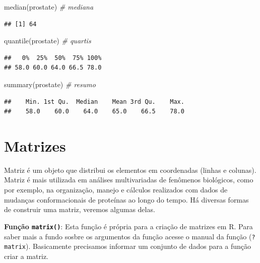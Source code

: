 \documentclass[
]{book}
\newenvironment{Shaded}{\begin{snugshade}}{\end{snugshade}}
\newcommand{\CommentTok}[1]{\textcolor[rgb]{0.56,0.35,0.01}{\textit{#1}}}
\newcommand{\FunctionTok}[1]{\textcolor[rgb]{0.00,0.00,0.00}{#1}}
\newcommand{\NormalTok}[1]{#1}
\begin{document}
\begin{Shaded}
\begin{Highlighting}[]
\FunctionTok{median}\NormalTok{(prostate)   }\CommentTok{\# mediana}
\end{Highlighting}
\end{Shaded}

\begin{verbatim}
## [1] 64
\end{verbatim}

\begin{Shaded}
\begin{Highlighting}[]
\FunctionTok{quantile}\NormalTok{(prostate) }\CommentTok{\# quartis}
\end{Highlighting}
\end{Shaded}

\begin{verbatim}
##   0%  25%  50%  75% 100% 
## 58.0 60.0 64.0 66.5 78.0
\end{verbatim}

\begin{Shaded}
\begin{Highlighting}[]
\FunctionTok{summary}\NormalTok{(prostate)  }\CommentTok{\# resumo}
\end{Highlighting}
\end{Shaded}

\begin{verbatim}
##    Min. 1st Qu.  Median    Mean 3rd Qu.    Max. 
##    58.0    60.0    64.0    65.0    66.5    78.0
\end{verbatim}

\hypertarget{matrizes}{%
\section{Matrizes}\label{matrizes}}

Matriz é um objeto que distribui os elementos em coordenadas (linhas e colunas). Matriz é mais utilizada em análises multivariadas de fenômenos biológicos, como por exemplo, na organização, manejo e cálculos realizados com dados de mudanças
conformacionais de proteínas ao longo do tempo. Há diversas formas de construir uma matriz, veremos algumas delas.

\textbf{Função \texttt{matrix()}}: Esta função é própria para a criação de matrizes em R. Para saber mais a fundo sosbre os argumentos da função acesse o manual da função (\texttt{?matrix}). Basicamente precisamos informar um conjunto de dados para a função criar a matriz.
\end{document}
